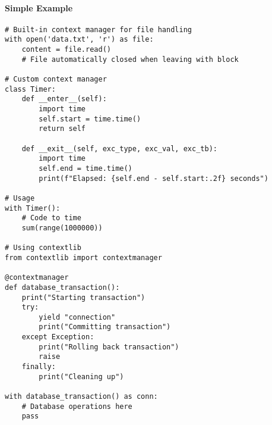 \paragraph{Simple Example}
\begin{lstlisting}[caption=Context Manager Examples]
# Built-in context manager for file handling
with open('data.txt', 'r') as file:
    content = file.read()
    # File automatically closed when leaving with block

# Custom context manager
class Timer:
    def __enter__(self):
        import time
        self.start = time.time()
        return self
    
    def __exit__(self, exc_type, exc_val, exc_tb):
        import time
        self.end = time.time()
        print(f"Elapsed: {self.end - self.start:.2f} seconds")

# Usage
with Timer():
    # Code to time
    sum(range(1000000))

# Using contextlib
from contextlib import contextmanager

@contextmanager
def database_transaction():
    print("Starting transaction")
    try:
        yield "connection"
        print("Committing transaction")
    except Exception:
        print("Rolling back transaction")
        raise
    finally:
        print("Cleaning up")

with database_transaction() as conn:
    # Database operations here
    pass
\end{lstlisting}

